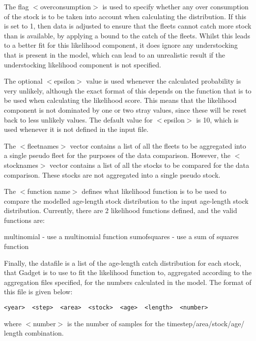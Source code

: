 \documentclass [a4paper, 10pt]{book}
\begin{document}
The flag $<$overconsumption$>$ is used to specify whether any over consumption of the stock is to be taken into account when calculating the distribution.  If this is set to 1, then data is adjusted to ensure that the fleets cannot catch more stock than is available, by applying a bound to the catch of the fleets.  Whilst this leads to a better fit for this likelihood component, it does ignore any understocking that is present in the model, which can lead to an unrealistic result if the understocking likelihood component is not specified.

\bigskip
The optional $<$epsilon$>$ value is used whenever the calculated probability is very unlikely, although the exact format of this depends on the function that is to be used when calculating the likelihood score.  This means that the likelihood component is not dominated by one or two stray values, since these will be reset back to less unlikely values.  The default value for $<$epsilon$>$ is 10, which is used whenever it is not defined in the input file.

\bigskip
The $<$fleetnames$>$ vector contains a list of all the fleets to be aggregated into a single pseudo fleet for the purposes of the data comparison.  However, the $<$stocknames$>$ vector contains a list of all the stocks to be compared for the data comparison.  These stocks are not aggregated into a single pseudo stock.

\bigskip
The $<$function name$>$ defines what likelihood function is to be used to compare the modelled age-length stock distribution to the input age-length stock distribution.  Currently, there are 2 likelihood functions defined, and the  valid functions are:

\bigskip
multinomial - use a multinomial function\newline
sumofsquares - use a sum of squares function

\bigskip
\newpage %
Finally, the datafile is a list of the age-length catch distribution for each stock, that Gadget is to use to fit the likelihood function to, aggregated according to the aggregation files specified, for the numbers calculated in the model.  The format of this file is given below:

{\small\begin{verbatim}
<year>  <step>  <area>  <stock>  <age>  <length>  <number>
\end{verbatim}}

where $<$number$>$ is the number of samples for the timestep/area/stock/age/ length combination.
\end{document}
